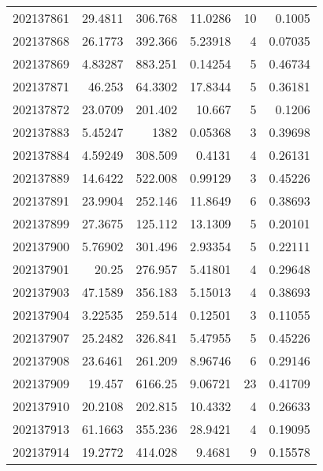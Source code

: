 \begin{tabular}{rrrrrr}
 202137861 &         29.4811  &      306.768  &           11.0286  &          10 & 0.1005  \\
 202137868 &         26.1773  &      392.366  &            5.23918 &           4 & 0.07035 \\
 202137869 &          4.83287 &      883.251  &            0.14254 &           5 & 0.46734 \\
 202137871 &         46.253   &       64.3302 &           17.8344  &           5 & 0.36181 \\
 202137872 &         23.0709  &      201.402  &           10.667   &           5 & 0.1206  \\
 202137883 &          5.45247 &     1382      &            0.05368 &           3 & 0.39698 \\
 202137884 &          4.59249 &      308.509  &            0.4131  &           4 & 0.26131 \\
 202137889 &         14.6422  &      522.008  &            0.99129 &           3 & 0.45226 \\
 202137891 &         23.9904  &      252.146  &           11.8649  &           6 & 0.38693 \\
 202137899 &         27.3675  &      125.112  &           13.1309  &           5 & 0.20101 \\
 202137900 &          5.76902 &      301.496  &            2.93354 &           5 & 0.22111 \\
 202137901 &         20.25    &      276.957  &            5.41801 &           4 & 0.29648 \\
 202137903 &         47.1589  &      356.183  &            5.15013 &           4 & 0.38693 \\
 202137904 &          3.22535 &      259.514  &            0.12501 &           3 & 0.11055 \\
 202137907 &         25.2482  &      326.841  &            5.47955 &           5 & 0.45226 \\
 202137908 &         23.6461  &      261.209  &            8.96746 &           6 & 0.29146 \\
 202137909 &         19.457   &     6166.25   &            9.06721 &          23 & 0.41709 \\
 202137910 &         20.2108  &      202.815  &           10.4332  &           4 & 0.26633 \\
 202137913 &         61.1663  &      355.236  &           28.9421  &           4 & 0.19095 \\
 202137914 &         19.2772  &      414.028  &            9.4681  &           9 & 0.15578 \\

\end{tabular}
